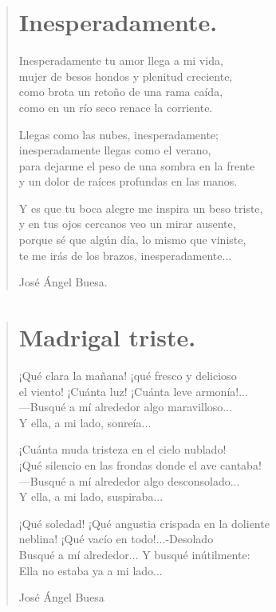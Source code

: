 \documentclass[11pt, portrait, twoside, notitlepage, openright]{book}
\begin{document}
\newpage
\begin{verse}
\begin{center}
\section{Inesperadamente.}
\end{center}
Inesperadamente tu amor llega a mi vida,\\
mujer de besos hondos y plenitud creciente,\\
como brota un retoño de una rama caída,\\
como en un río seco renace la corriente.
\newline

Llegas como las nubes, inesperadamente;\\
inesperadamente llegas como el verano,\\
para dejarme el peso de una sombra en la frente\\
y un dolor de raíces profundas en las manos.
\newline

Y es que tu boca alegre me inspira un beso triste,\\
y en tus ojos cercanos veo un mirar ausente,\\
porque sé que algún día, lo mismo que viniste,\\
te me irás de los brazos, inesperadamente...
\newline

José Ángel Buesa.
\end{verse}

\newpage
\begin{verse}
\begin{center}
\section{Madrigal triste.}
\end{center}
¡Qué clara la mañana! ¡qué fresco y delicioso\\
el viento! ¡Cuánta luz! ¡Cuánta leve armonía!...\\
—Busqué a mí alrededor algo maravilloso...\\
Y ella, a mi lado, sonreía...
\newline

¡Cuánta muda tristeza en el cielo nublado!\\
¡Qué silencio en las frondas donde el ave cantaba!\\
—Busqué a mí alrededor algo desconsolado...\\
Y ella, a mi lado, suspiraba...
\newline

¡Qué soledad! ¡Qué angustia crispada en la doliente\\
neblina! ¡Qué vacío en todo!...-Desolado\\
Busqué a mí alrededor... Y busqué inútilmente:\\
Ella no estaba ya a mi lado...
\newline

José Ángel Buesa
\end{verse}
\end{document}
